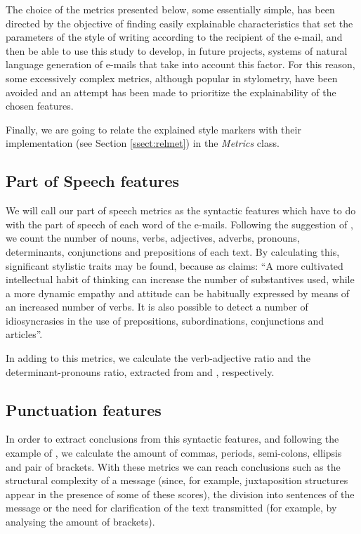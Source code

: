 The choice of the metrics presented below, some essentially simple, has been directed by the objective of finding easily explainable characteristics that set the parameters of the style of writing according to the recipient of the e-mail, and then be able to use this study to develop, in future projects, systems of natural language generation of e-mails that take into account this factor. For this reason, some excessively complex metrics, although popular in stylometry, have been avoided and an attempt has been made to prioritize the explainability of the chosen features.

Finally, we are going to relate the explained style markers with their implementation (see Section \ref{ssect:relmet}) in the \textit{Metrics} class.

\subsection{Part of Speech features}\label{ssect:posf}

We will call our part of speech metrics as the syntactic features which have to do with the part of speech of each word of the e-mails. Following the suggestion of \cite{holmes1985analysis}, we count the number of nouns, verbs, adjectives, adverbs, pronouns, determinants, conjunctions and prepositions of each text. By calculating this, significant stylistic traits may be found, because as \cite{somers1966statistical} claims: ``A more cultivated intellectual habit of thinking can increase the number of substantives used, while a more dynamic empathy and attitude can be habitually expressed by means of an increased number of verbs. It is also possible to detect a number of idiosyncrasies in the use of prepositions, subordinations, conjunctions and articles''.

In adding to this metrics, we calculate the verb-adjective ratio and the determinant-pronouns ratio, extracted from \cite{antosch1969diagnosis} and \cite{brainerd1974weighting}, respectively.

\subsection{Punctuation features}\label{ssect:punctf}

In order to extract conclusions from this syntactic features, and following the example of \cite{calix2008stylometry}, we calculate the amount of commas, periods, semi-colons, ellipsis and pair of brackets. With these metrics we can reach conclusions such as the structural complexity of a message (since, for example, juxtaposition structures appear in the presence of some of these scores), the division into sentences of the message or the need for clarification of the text transmitted (for example, by analysing the amount of brackets).

